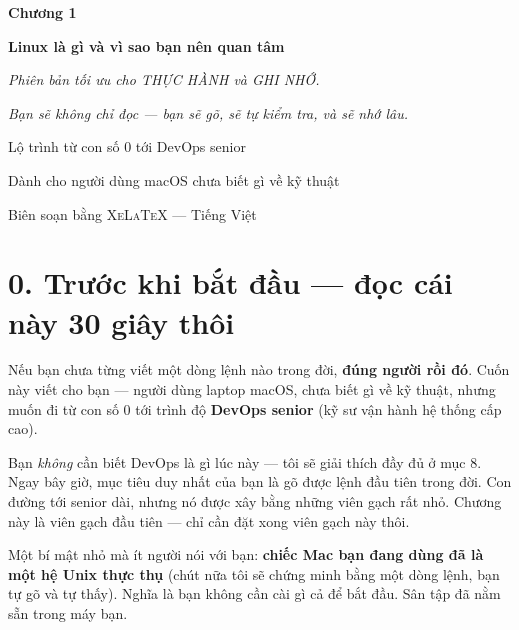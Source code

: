\documentclass[12pt,a4paper]{article}
\begin{document}
\begin{titlepage}
\centering
\vspace*{3cm}
{\Huge\bfseries\color{labframe} Chương 1\par}
\vspace{0.8cm}
{\LARGE\bfseries Linux là gì và vì sao bạn nên quan tâm\par}
\vspace{1.2cm}
{\large\itshape Phiên bản tối ưu cho THỰC HÀNH và GHI NHỚ.\par}
{\large\itshape Bạn sẽ không chỉ đọc — bạn sẽ gõ, sẽ tự kiểm tra, và sẽ nhớ lâu.\par}
\vspace{2cm}
{\large Lộ trình từ con số 0 tới DevOps senior\par}
\vspace{0.5cm}
{\large Dành cho người dùng macOS chưa biết gì về kỹ thuật\par}
\vfill
{\small Biên soạn bằng \textsc{XeLaTeX} — Tiếng Việt\par}
\end{titlepage}

\tableofcontents
\newpage

\section*{0. Trước khi bắt đầu — đọc cái này 30 giây thôi}

Nếu bạn chưa từng viết một dòng lệnh nào trong đời, \textbf{đúng người rồi đó}. Cuốn này viết cho bạn — người dùng laptop macOS, chưa biết gì về kỹ thuật, nhưng muốn đi từ con số 0 tới trình độ \textbf{DevOps senior} (kỹ sư vận hành hệ thống cấp cao).

\begin{notebox}
Bạn \textit{không} cần biết DevOps là gì lúc này — tôi sẽ giải thích đầy đủ ở mục 8. Ngay bây giờ, mục tiêu duy nhất của bạn là gõ được lệnh đầu tiên trong đời. Con đường tới senior dài, nhưng nó được xây bằng những viên gạch rất nhỏ. Chương này là viên gạch đầu tiên — chỉ cần đặt xong viên gạch này thôi.
\end{notebox}

Một bí mật nhỏ mà ít người nói với bạn: \textbf{chiếc Mac bạn đang dùng đã là một hệ Unix thực thụ} (chút nữa tôi sẽ chứng minh bằng một dòng lệnh, bạn tự gõ và tự thấy). Nghĩa là bạn không cần cài gì cả để bắt đầu. Sân tập đã nằm sẵn trong máy bạn.
\end{document}
